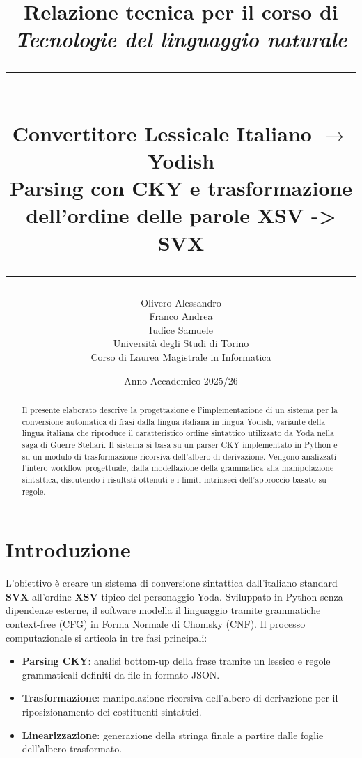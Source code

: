 \documentclass[12pt, a4paper]{article}
\title{
    \vspace{-1cm}
    {\large Relazione tecnica per il corso di}\\[0.3cm]
    {\large \textit{Tecnologie del linguaggio naturale}}\\[1cm]
    \rule{\linewidth}{1.5pt}\\[0.5cm]
    {\LARGE \textbf{Convertitore Lessicale Italiano $\rightarrow$ Yodish}}\\[0.3cm]
    {\large Parsing con CKY e trasformazione dell'ordine delle parole XSV -> SVX}\\[0.3cm]
    \rule{\linewidth}{1.5pt}
}
\author{
    \begin{tabular}[t]{c}
        Olivero Alessandro \\
        Franco Andrea\\
        Iudice Samuele\\[0.4cm]
        \small Università degli Studi di Torino \\
        \small Corso di Laurea Magistrale in Informatica
    \end{tabular}
}
\date{Anno Accademico 2025/26}
\begin{document}
\maketitle
\thispagestyle{empty}
\vspace{1cm}

\begin{abstract}
\noindent
Il presente elaborato descrive la progettazione e l'implementazione di un sistema per la
conversione automatica di frasi dalla lingua italiana in lingua Yodish,
variante della lingua italiana che riproduce il caratteristico ordine sintattico
utilizzato da Yoda nella saga di Guerre Stellari. Il sistema si basa su un parser CKY implementato in Python e su un modulo di trasformazione
ricorsiva dell'albero di derivazione. Vengono analizzati l'intero workflow progettuale, dalla modellazione della grammatica alla manipolazione sintattica, discutendo i risultati ottenuti e i limiti intrinseci dell'approccio basato su regole.
\end{abstract}

\newpage
\tableofcontents
\newpage

\section{Introduzione}

L'obiettivo è creare un sistema di conversione sintattica dall'italiano standard \textbf{SVX} all'ordine \textbf{XSV} tipico del personaggio Yoda. Sviluppato in Python senza dipendenze esterne, il software modella il linguaggio tramite grammatiche context-free (CFG) in Forma Normale di Chomsky (CNF).
Il processo computazionale si articola in tre fasi principali:
\begin{itemize}
    \item \textbf{Parsing CKY}: analisi bottom-up della frase tramite un lessico e regole grammaticali definiti da file in formato JSON.
    \item \textbf{Trasformazione}: manipolazione ricorsiva dell'albero di derivazione per il riposizionamento dei costituenti sintattici.
    \item \textbf{Linearizzazione}: generazione della stringa finale a partire dalle foglie dell'albero trasformato.
\end{itemize}
\end{document}
